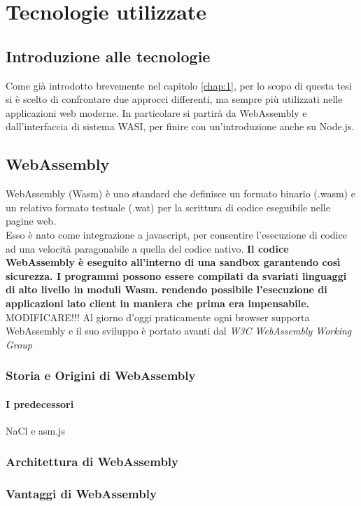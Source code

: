 \chapter{Tecnologie utilizzate}
\label{chap:2}

\section{Introduzione alle tecnologie}
\label{sec:IntroduzioneTecnologie}
Come già introdotto brevemente nel capitolo \ref{chap:1}, per lo scopo di questa tesi si è scelto di confrontare due approcci differenti, ma sempre più utilizzati nelle applicazioni web moderne.
In particolare si partirà da WebAssembly e dall'interfaccia di sistema WASI, per finire con un'introduzione anche su Node.js.

\section{WebAssembly}
\label{sec:Wasm}
WebAssembly (Wasm) è uno standard che definisce un formato binario (.wasm) e un relativo formato testuale (.wat) per la scrittura di codice eseguibile nelle pagine web. 
\\Esso è nato come integrazione a javascript, per consentire l'esecuzione di codice ad una velocità paragonabile a quella del codice nativo.
\textbf{Il codice WebAssembly è eseguito all'interno di una sandbox garantendo così sicurezza.
I programmi possono essere compilati da svariati linguaggi di alto livello in moduli Wasm. rendendo possibile l'esecuzione di applicazioni lato client in maniera che prima era impensabile.} MODIFICARE!!!
Al giorno d'oggi praticamente ogni browser supporta WebAssembly e il suo sviluppo è portato avanti dal \emph{W3C WebAssembly Working Group}

\subsection{Storia e Origini di WebAssembly}
\subsubsection{I predecessori}
NaCl e asm.js
\subsection{Architettura di WebAssembly}
\subsection{Vantaggi di WebAssembly}

